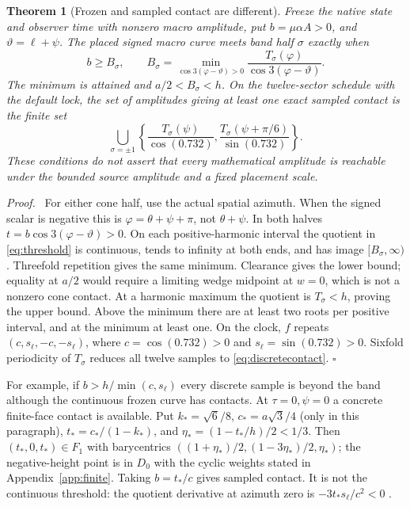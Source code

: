 \documentclass[11pt,a4paper]{article}
\numberwithin{equation}{section}
\newtheorem{theorem}{Theorem}[section]
\newenvironment{proof}[1][Proof]{\par\noindent\textit{#1.}\ \ignorespaces}
{\unskip\nobreak\hfill$\square$\par}
\begin{document}
\begin{theorem}[Frozen and sampled contact are different]\label{thm:frozen}
Freeze the native state and observer time with nonzero macro amplitude, put
$b=\mu\alpha A>0$, and $\vartheta=\ell+\psi$. The placed signed macro curve
meets band half $\sigma$ exactly when
\begin{equation}\label{eq:threshold}
b\geq B_\sigma,\qquad
B_\sigma=\min_{\cos3(\varphi-\vartheta)>0}
\frac{T_\sigma(\varphi)}{\cos3(\varphi-\vartheta)} .
\end{equation}
The minimum is attained and $a/2<B_\sigma<h$.
On the twelve-sector schedule with the default lock, the set of amplitudes
giving at least one exact sampled contact is the finite set
\begin{equation}\label{eq:discretecontact}
\bigcup_{\sigma=\pm1}
\left\{\frac{T_\sigma(\psi)}{\cos(0.732)},
\frac{T_\sigma(\psi+\pi/6)}{\sin(0.732)}\right\}.
\end{equation}
These conditions do not assert that every mathematical amplitude is reachable
under the bounded source amplitude and a fixed placement scale.
\end{theorem}
\begin{proof}
For either cone half, use the actual spatial azimuth. When the signed scalar
is negative this is $\varphi=\theta+\psi+\pi$, not $\theta+\psi$.
In both halves $t=b\cos3(\varphi-\vartheta)>0$.
On each positive-harmonic interval the quotient in \eqref{eq:threshold}
is continuous, tends to infinity at both ends, and has image $[B_\sigma,\infty)$.
Threefold repetition gives the same minimum. Clearance gives the lower
bound; equality at $a/2$ would require a limiting wedge midpoint at $w=0$,
which is not a nonzero cone contact. At a harmonic maximum the quotient
is $T_\sigma<h$, proving the upper bound. Above the minimum there are
at least two roots per positive interval, and at the minimum at least one.
On the clock, $f$ repeats $(c,s_\ell,-c,-s_\ell)$, where
$c=\cos(0.732)>0$ and $s_\ell=\sin(0.732)>0$.
Sixfold periodicity of $T_\sigma$ reduces all twelve samples to
\eqref{eq:discretecontact}.
\end{proof}

For example, if $b>h/\min(c,s_\ell)$ every discrete sample is beyond the
band although the continuous frozen curve has contacts. At $\tau=0,\psi=0$ a
concrete finite-face contact is available. Put
$k_*= \sqrt6/8$, $c_*=a\sqrt3/4$ (only in this paragraph),
$t_*=c_*/(1-k_*)$, and $\eta_*=(1-t_*/h)/2<1/3$.
Then $(t_*,0,t_*)\in F_1$ with barycentrics
$((1+\eta_*)/2,(1-3\eta_*)/2,\eta_*)$; the negative-height point is in
$D_0$ with the cyclic weights stated in Appendix~\ref{app:finite}.
Taking $b=t_*/c$ gives sampled contact. It is not the continuous threshold:
the quotient derivative at azimuth zero is $-3t_*s_\ell/c^2<0$
\cite[R1, Sections 4--6]{R1}.
\end{document}
